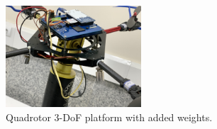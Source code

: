 \documentclass[peerreview]{IEEEtran}
\begin{document}
\begin{figure}[H]
	\centering
	\includegraphics[width=0.45\textwidth]{../Figure/implementation/weight/Quad_with_weight.jpg}
	\caption{Quadrotor 3-DoF platform with added weights.} %
	\label{fig:quadrotor_with_weight}
	\centering
	\hfill

\end{figure}
\end{document}
